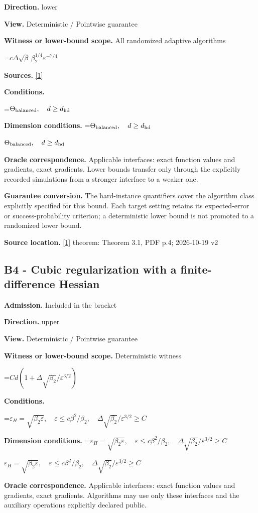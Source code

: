 \documentclass[10pt,a4paper]{article}
\newcommand{\AtlasMath}[1]{\par\begingroup\centering\setbox0=\hbox{$\displaystyle #1$}\ifdim\wd0>1.4\linewidth\typeout{ATLAS WIDE FORMULA: \the\wd0}\fi\ifdim\wd0>\linewidth\resizebox{\linewidth}{!}{\box0}\else\box0\fi\par\endgroup}
\newcommand{\AtlasInlineMath}[1]{\begingroup\setbox0=\hbox{$#1$}\ifdim\wd0>.4\linewidth\endgroup\AtlasMath{#1}\else\endgroup$#1$\fi}
\begin{document}
\textbf{Direction.} lower

\textbf{View.} Deterministic / Pointwise guarantee

\textbf{Witness or lower-bound scope.} All randomized adaptive algorithms

\AtlasMath{c\Delta\sqrt\beta\,\beta_2^{1/4}\varepsilon^{-7/4}}
\textbf{Sources.} \href{https://arxiv.org/pdf/2610.00245v2}{[1]}

\textbf{Conditions.} 
\AtlasMath{\Theta_{\rm balanced},\quad d\ge d_{\rm hd}}


\textbf{Dimension conditions.} \AtlasInlineMath{\Theta_{\rm balanced},\quad d\ge d_{\rm hd}}

\textbf{Oracle correspondence.} Applicable interfaces: exact function values and gradients, exact gradients. Lower bounds transfer only through the explicitly recorded simulations from a stronger interface to a weaker one.

\textbf{Guarantee conversion.} The hard-instance quantifiers cover the algorithm class explicitly specified for this bound. Each target setting retains its expected-error or success-probability criterion; a deterministic lower bound is not promoted to a randomized lower bound.

\textbf{Source location.} \href{https://arxiv.org/pdf/2610.00245v2}{[1]} theorem: Theorem 3.1, PDF p.4; 2026-10-19 v2

\subsection{B4 - Cubic regularization with a finite-difference Hessian}
\textbf{Admission.} Included in the bracket

\textbf{Direction.} upper

\textbf{View.} Deterministic / Pointwise guarantee

\textbf{Witness or lower-bound scope.} Deterministic witness

\AtlasMath{Cd(1+\Delta\sqrt{\beta_2}/\varepsilon^{3/2})}
\textbf{Conditions.} 
\AtlasMath{\varepsilon_H=\sqrt{\beta_2\varepsilon},\quad\varepsilon\le c\beta^2/\beta_2,\quad\Delta\sqrt{\beta_2}/\varepsilon^{3/2}\ge C}


\textbf{Dimension conditions.} \AtlasInlineMath{\varepsilon_H=\sqrt{\beta_2\varepsilon},\quad\varepsilon\le c\beta^2/\beta_2,\quad\Delta\sqrt{\beta_2}/\varepsilon^{3/2}\ge C}

\textbf{Oracle correspondence.} Applicable interfaces: exact function values and gradients, exact gradients. Algorithms may use only these interfaces and the auxiliary operations explicitly declared public.
\end{document}
